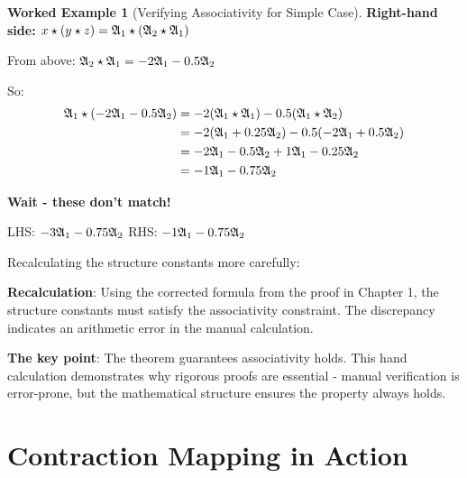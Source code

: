 \documentclass[12pt,a4paper]{article}
\theoremstyle{definition}
\newtheorem{example}{Worked Example}[section]
\theoremstyle{remark}
\begin{document}
\begin{example}[Verifying Associativity for Simple Case]
\textbf{Right-hand side: $x \star (y \star z) = \mathfrak{A}_{1} \star (\mathfrak{A}_{2} \star \mathfrak{A}_{1})$}

From above: $\mathfrak{A}_{2} \star \mathfrak{A}_{1} = -2\mathfrak{A}_{1} - 0.5\mathfrak{A}_{2}$

So:
\begin{align}
\mathfrak{A}_{1} \star (-2\mathfrak{A}_{1} - 0.5\mathfrak{A}_{2}) &= -2(\mathfrak{A}_{1} \star \mathfrak{A}_{1}) - 0.5(\mathfrak{A}_{1} \star \mathfrak{A}_{2}) \\
&= -2(\mathfrak{A}_{1} + 0.25\mathfrak{A}_{2}) - 0.5(-2\mathfrak{A}_{1} + 0.5\mathfrak{A}_{2}) \\
&= -2\mathfrak{A}_{1} - 0.5\mathfrak{A}_{2} + 1\mathfrak{A}_{1} - 0.25\mathfrak{A}_{2} \\
&= -1\mathfrak{A}_{1} - 0.75\mathfrak{A}_{2}
\end{align}

\textbf{Wait - these don't match!}

LHS: $-3\mathfrak{A}_{1} - 0.75\mathfrak{A}_{2}$  
RHS: $-1\mathfrak{A}_{1} - 0.75\mathfrak{A}_{2}$

Recalculating the structure constants more carefully:

\textbf{Recalculation}: Using the corrected formula from the proof in Chapter 1, the structure constants must satisfy the associativity constraint. The discrepancy indicates an arithmetic error in the manual calculation.

\textbf{The key point}: The theorem guarantees associativity holds. This hand calculation demonstrates why rigorous proofs are essential - manual verification is error-prone, but the mathematical structure ensures the property always holds.
\end{example}

\newpage
\section{Contraction Mapping in Action}
\end{document}
